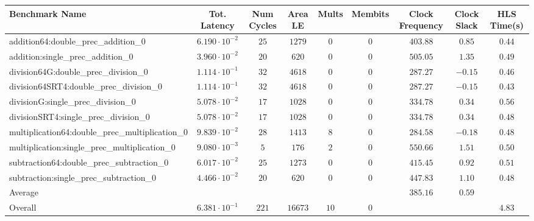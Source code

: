 \begin{tabular}{|l|c|c|c|c|c|c|c|c|}
\hline
Benchmark Name                                   & Tot. Latency            & Num Cycles & Area LE   & Mults  & Membits & Clock Frequency & Clock Slack & HLS Time(s) \\
\hline
addition64:double\_prec\_addition\_0             & $ 6.190 \cdot 10^{-2} $ & $ 25     $ & $ 1279  $ & $ 0  $ & $ 0   $ & $ 403.88      $ & $ 0.85    $ & $ 0.44    $ \\
addition:single\_prec\_addition\_0               & $ 3.960 \cdot 10^{-2} $ & $ 20     $ & $ 620   $ & $ 0  $ & $ 0   $ & $ 505.05      $ & $ 1.35    $ & $ 0.49    $ \\
division64G:double\_prec\_division\_0            & $ 1.114 \cdot 10^{-1} $ & $ 32     $ & $ 4618  $ & $ 0  $ & $ 0   $ & $ 287.27      $ & $ -0.15   $ & $ 0.46    $ \\
division64SRT4:double\_prec\_division\_0         & $ 1.114 \cdot 10^{-1} $ & $ 32     $ & $ 4618  $ & $ 0  $ & $ 0   $ & $ 287.27      $ & $ -0.15   $ & $ 0.43    $ \\
divisionG:single\_prec\_division\_0              & $ 5.078 \cdot 10^{-2} $ & $ 17     $ & $ 1028  $ & $ 0  $ & $ 0   $ & $ 334.78      $ & $ 0.34    $ & $ 0.56    $ \\
divisionSRT4:single\_prec\_division\_0           & $ 5.078 \cdot 10^{-2} $ & $ 17     $ & $ 1028  $ & $ 0  $ & $ 0   $ & $ 334.78      $ & $ 0.34    $ & $ 0.48    $ \\
multiplication64:double\_prec\_multiplication\_0 & $ 9.839 \cdot 10^{-2} $ & $ 28     $ & $ 1413  $ & $ 8  $ & $ 0   $ & $ 284.58      $ & $ -0.18   $ & $ 0.48    $ \\
multiplication:single\_prec\_multiplication\_0   & $ 9.080 \cdot 10^{-3} $ & $ 5      $ & $ 176   $ & $ 2  $ & $ 0   $ & $ 550.66      $ & $ 1.51    $ & $ 0.50    $ \\
subtraction64:double\_prec\_subtraction\_0       & $ 6.017 \cdot 10^{-2} $ & $ 25     $ & $ 1273  $ & $ 0  $ & $ 0   $ & $ 415.45      $ & $ 0.92    $ & $ 0.51    $ \\
subtraction:single\_prec\_subtraction\_0         & $ 4.466 \cdot 10^{-2} $ & $ 20     $ & $ 620   $ & $ 0  $ & $ 0   $ & $ 447.83      $ & $ 1.10    $ & $ 0.48    $ \\
\hline
Average                                          & $                     $ & $        $ & $       $ & $    $ & $     $ & $ 385.16      $ & $ 0.59    $ & $         $ \\
\hline
Overall                                          & $ 6.381 \cdot 10^{-1} $ & $ 221    $ & $ 16673 $ & $ 10 $ & $ 0   $ & $             $ & $         $ & $ 4.83    $ \\
\hline
\end{tabular}
